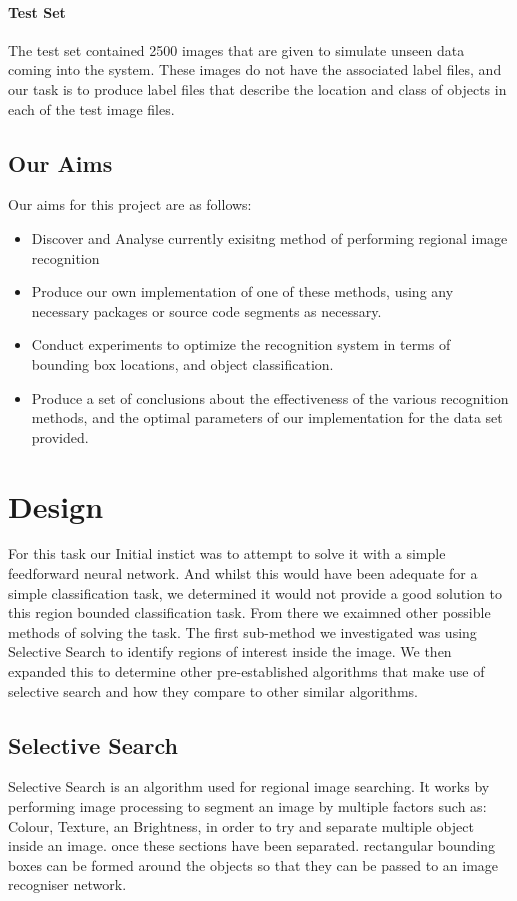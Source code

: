 \documentclass[10pt]{article}
\begin{document}
\paragraph{Test Set}
The test set contained 2500 images that are given to simulate unseen data coming into the system. These images do not have the associated label files, and our task is to produce label files that describe the location and class of objects in each of the test image files.

\subsection{Our Aims}
Our aims for this project are as follows:
\begin{itemize}
	\item Discover and Analyse currently exisitng method of performing regional image recognition
	\item Produce our own implementation of one of these methods, using any necessary packages or source code segments as necessary.
	\item Conduct experiments to optimize the recognition system in terms of bounding box locations, and object classification.
	\item Produce a set of conclusions about the effectiveness of the various recognition methods, and the optimal parameters of our implementation for the data set provided.
\end {itemize}

\section{Design}
For this task our Initial instict was to attempt to solve it with a simple feedforward neural network. And whilst this would have been adequate for a simple classification task, we determined it would not provide a good solution to this region bounded classification task. From there we exaimned other possible methods of solving the task. The first sub-method we investigated was using Selective Search to identify regions of interest inside the image. We then expanded this to determine other pre-established algorithms that make use of selective search and how they compare to other similar algorithms.

\subsection{Selective Search}
Selective Search is an algorithm used for regional image searching. It works by performing image processing to segment an image by multiple factors such as: Colour, Texture, an Brightness, in order to try and separate multiple object inside an image. once these sections have been separated. rectangular bounding boxes can be formed around the objects so that they can be passed to an image recogniser network.
	
\end{document}

